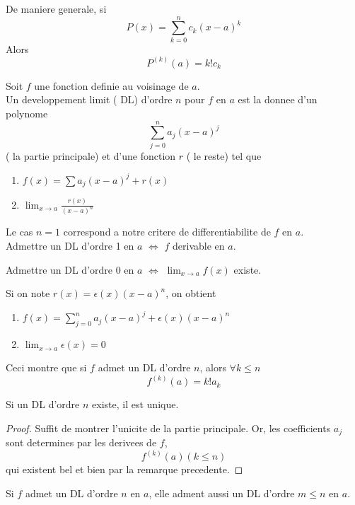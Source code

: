 \documentclass[../main.tex]{subfiles}
\begin{document}
De maniere generale, si
\[ 
	P( x) = \sum_{k=0}^{ n}c_k ( x-a) ^{k}
\]
Alors
\[ 
	P^{( k) }( a) = k! c_k
\]
\begin{defn}
Soit $f$ une fonction definie au voisinage de $a$.\\
Un developpement limit ( DL) d'ordre $n$ pour $f$ en $a$ est la donnee d'un polynome 
\[ 
	\sum_{j=0}^{ n}a_j ( x-a)^{j} 
\]
( la partie principale) et d'une fonction $r$ ( le reste) tel que
\begin{enumerate}
	\item $f( x) = \sum a_j ( x-a)^{j}+ r( x) $ 
	\item $\lim_{x \to a} \frac{r( x) }{( x-a)^{n}}$
\end{enumerate}

\end{defn}
\begin{rmq}
Le cas $n=1$ correspond a notre critere de differentiabilite de $f$ en $a$.\\
Admettre un DL d'ordre 1 en $a$ $\iff$ $f$ derivable en $a$.
\end{rmq}
\begin{rmq}
	Admettre un DL d'ordre 0 en $a$ $\iff$ $ \lim_{x \to a} f( x) $ existe.
\end{rmq}
\begin{rmq}
	Si on note $r( x) = \epsilon( x) ( x-a)^{n}$, on obtient 
	\begin{enumerate}
		\item $f( x) = \sum_{j=0}^{ n}a_j ( x-a) ^{j} + \epsilon( x) ( x-a) ^{n}$
		\item $\lim_{x \to a} \epsilon( x) = 0$
	\end{enumerate}
	Ceci montre que si $f$ admet un DL d'ordre $n$, alors $\forall k \leq n$ 
	\[ 
		f^{( k) }( a) = k! a_k
	\]
	
	
\end{rmq}
\begin{propo}
Si un DL d'ordre $n$ existe, il est unique.
\end{propo}
\begin{proof}
Suffit de montrer l'unicite de la partie principale. Or, les coefficients $a_j$ sont determines par les derivees de $f$,
\[ 
	f^{( k) }( a)  ( k\leq n) 
\]
qui existent bel et bien par la remarque precedente.
\end{proof}
\begin{propo}
Si $f$ admet un DL d'ordre $n$ en $a$, elle adment aussi un DL d'ordre $m \leq n$ en $a$.
\end{propo}
\end{document}
